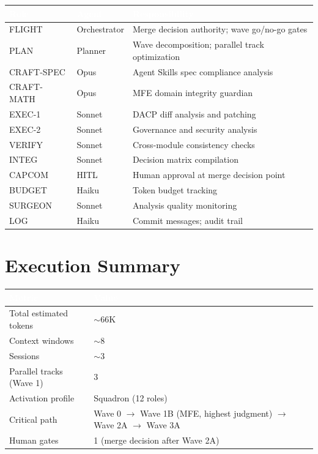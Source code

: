 \documentclass[11pt,letterpaper]{article}
\newcommand{\tableheader}[1]{\textbf{\sffamily\textcolor{white}{#1}}}
\begin{document}
\begin{center}
\begin{tabularx}{\textwidth}{L{2.5cm}L{2cm}X}
\toprule
{}
\tableheader{Role} & \tableheader{Agent} & \tableheader{Responsibility} \\
\midrule
FLIGHT & Orchestrator & Merge decision authority; wave go/no-go gates \\
PLAN & Planner & Wave decomposition; parallel track optimization \\
CRAFT-SPEC & Opus & Agent Skills spec compliance analysis \\
CRAFT-MATH & Opus & MFE domain integrity guardian \\
EXEC-1 & Sonnet & DACP diff analysis and patching \\
EXEC-2 & Sonnet & Governance and security analysis \\
VERIFY & Sonnet & Cross-module consistency checks \\
INTEG & Sonnet & Decision matrix compilation \\
CAPCOM & HITL & Human approval at merge decision point \\
BUDGET & Haiku & Token budget tracking \\
SURGEON & Sonnet & Analysis quality monitoring \\
LOG & Haiku & Commit messages; audit trail \\
\bottomrule
\end{tabularx}
\end{center}

\section{Execution Summary}

\begin{center}
\begin{tabularx}{\textwidth}{L{5cm}X}
\toprule
{}
\tableheader{Metric} & \tableheader{Value} \\
\midrule
Total estimated tokens & $\sim$66K \\
Context windows & $\sim$8 \\
Sessions & $\sim$3 \\
Parallel tracks (Wave 1) & 3 \\
Activation profile & Squadron (12 roles) \\
Critical path & Wave 0 $\rightarrow$ Wave 1B (MFE, highest judgment) $\rightarrow$ Wave 2A $\rightarrow$ Wave 3A \\
Human gates & 1 (merge decision after Wave 2A) \\
\bottomrule
\end{tabularx}
\end{center}
\end{document}
